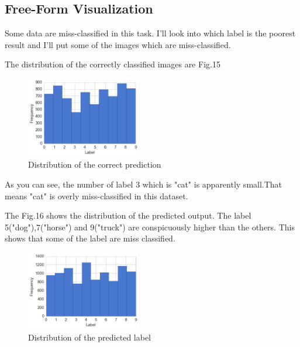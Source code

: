 \subsection{Free-Form Visualization}
Some data are miss-classified in this task. I'll look into which label is the poorest result and I'll put some of the images which are miss-classified.

The distribution of the correctly classified images are Fig.15

\begin{figure}[H]

	\begin{center}
	\includegraphics[width=5cm]{picture/label_correct.png}
	\caption{Distribution of the correct prediction}
	\end{center}
	\label{fig:15}

\end{figure}

As you can see, the number of label 3 which is "cat" is apparently small.That means "cat" is overly miss-classified in this dataset.

The Fig.16 shows the distribution of the predicted output. The label 5("dog"),7("horse") and 9("truck") are conspicuously higher than the others. This shows that some of the label are miss classified.

\begin{figure}[H]

	\begin{center}
	\includegraphics[width=5cm]{picture/output.png}
	\caption{Distribution of the predicted label}
	\end{center}
	\label{fig:16}

\end{figure}





